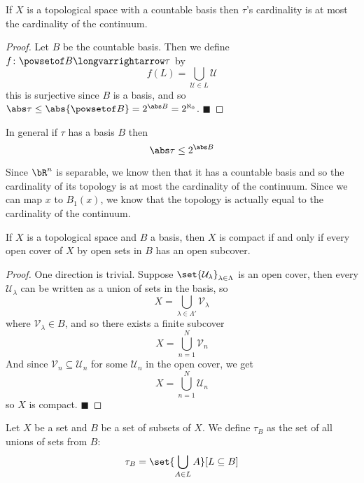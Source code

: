 \documentclass[10pt]{article}
\def\qed{\hskip1cm\penalty-100\hbox{}\hfill$\blacksquare$}
\def\mU{\mathcal{U}}
\def\mV{\mathcal{V}}
\def\longto{\longvarrightarrow}
\begin{document}
\begin{prop*}

    If $X$ is a topological space with a countable basis then $\tau$'s cardinality is at most the cardinality of the continuum.

\end{prop*}

\begin{proof}

    Let $B$ be the countable basis.
    Then we define $f\colon\powsetof B\longto\tau$ by
    \[ f(L) = \bigcup_{\mU\in L}\mU \]
    this is surjective since $B$ is a basis, and so $\abs\tau\leq\abs{\powsetof B}=2^{\abs B}=2^{\aleph_0}$.
    \qed

\end{proof}

In general if $\tau$ has a basis $B$ then
\[ \abs\tau\leq 2^{\abs B} \]

Since $\bR^n$ is separable, we know then that it has a countable basis and so the cardinality of its topology is at most the cardinality of the continuum.
Since we can map $x$ to $B_1(x)$, we know that the topology is actually equal to the cardinality of the continuum.

\begin{prop*}

    If $X$ is a topological space and $B$ a basis, then $X$ is compact if and only if every open cover of $X$ by open sets in $B$ has an open subcover.

\end{prop*}

\begin{proof}

    One direction is trivial.
    Suppose $\set{\mU_\lambda}_{\lambda\in\Lambda}$ is an open cover, then every $\mU_\lambda$ can be written as a union of sets in the basis, so
    \[ X = \bigcup_{\lambda\in\Lambda'}\mV_\lambda \]
    where $\mV_\lambda\in B$, and so there exists a finite subcover
    \[ X = \bigcup_{n=1}^N \mV_n \]
    And since $\mV_n\subseteq\mU_n$ for some $\mU_n$ in the open cover, we get
    \[ X = \bigcup_{n=1}^N\mU_n \]
    so $X$ is compact.
    \qed

\end{proof}

\begin{defn*}

    Let $X$ be a set and $B$ be a set of subsets of $X$.
    We define $\tau_B$ as the set of all unions of sets from $B$:
    \[ \tau_B = \set{\bigcup_{A\in L}A}[L\subseteq B] \]

\end{defn*}
\end{document}
